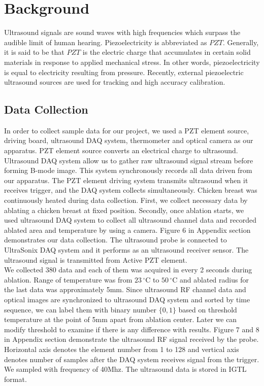 \documentclass[11pt,letterpaper]{article}
\begin{document}
\section{Background}
Ultrasound signals are sound waves with high frequencies which surpass the audible limit of human hearing. Piezoelectricity is abbreviated as $\textit{PZT}$. Generally, it is said to be that $\textit{PZT}$ is the electric charge that accumulates in certain solid materials in response to applied mechanical stress. In other words, piezoelectricity is equal to electricity resulting from pressure. Recently, external piezoelectric ultrasound sources are used for tracking and high accuracy calibration.



\subsection{Data Collection}
In order to collect sample data for our project, we used a PZT element source, driving board, ultrasound DAQ system, thermometer and optical camera as our apparatus. PZT element source converts an electrical charge to ultrasound. Ultrasound DAQ system allow us to gather raw ultrasound signal stream before forming B-mode image. This system synchronously records all data driven from our apparatus. The PZT element driving system transmits ultrasound when it receives trigger, and the DAQ system collects simultaneously. Chicken breast was continuously heated during data collection. First, we collect necessary data by ablating a chicken breast at fixed position. Secondly, once ablation starts, we used ultrasound DAQ system to collect all ultrasound channel data and recorded ablated area and temperature by using a camera. Figure 6 in Appendix section demonstrates our data collection. The ultrasound probe is connected to UltraSonix DAQ system and it performs as an ultrasound receiver sensor. The ultrasound signal is transmitted from Active PZT element. \\
We collected 380 data and each of them was acquired in every 2 seconds during ablation. Range of temperature was from $23\,^{\circ}\mathrm{C}$ to $50\,^{\circ}\mathrm{C}$ and ablated radius for the last data was approximately 5mm. Since ultrasound RF channel data and optical images are synchronized to ultrasound DAQ system and sorted by time sequence, we can label them with binary number $\{0,1\}$ based on threshold temperature at the point of 5mm apart from ablation center. Later we can modify threshold to examine if there is any difference with results. Figure 7 and 8 in Appendix section demonstrate the ultrasound RF signal received by the probe. Horizontal axis denotes the element number from 1 to 128 and vertical axis denotes number of samples after the DAQ system receives signal from the trigger. We sampled with frequency of 40Mhz. The ultrasound data is stored in IGTL format. 
\end{document}
